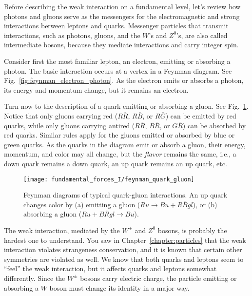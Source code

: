 Before describing the weak interaction on a fundamental level,
let's review how photons and gluons serve as the messengers for
the electromagnetic and strong interactions between leptons and
quarks. Messenger particles that transmit interactions, such as
photons, gluons, and the $W$'s and $Z^0$'s, are also called
intermediate bosons, because they mediate interactions and carry
integer spin.

Consider first the most familiar lepton, an electron, emitting or
absorbing a photon.  The basic interaction occurs at a vertex in a
Feynman diagram.  See Fig.~\ref{fig:feynman_electron_photon}.  As
the electron emits or absorbs a photon, its energy and momentum
change, but it remains an electron.

Turn now to the description of a quark emitting or absorbing a
gluon. See Fig.~\ref{fig:feynman_quark_gluon}.  Notice that only
gluons carrying red ($R\overline R$, $R\overline B$, or
$R\overline G$) can be emitted by red quarks, while only gluons
carrying antired ($R\overline R$, $B\overline R$, or $G\overline
R$) can be absorbed by red quarks.  Similar rules apply for the
gluons emitted or absorbed by blue or green quarks.  As the quarks
in the diagram emit or absorb a gluon, their energy, momentum, and
color may all change, but the {\em flavor} remains the same, i.e.,
a down quark remains a down quark, an up quark remains an up
quark, etc.


\begin{figure}[tbp]
\begin{center}
\begin{minipage}{10cm}
\begin{center}
\texttt{[image: fundamental\_forces\_I/feynman\_quark\_gluon]}
\caption{Feynman diagrams of typical quark-gluon interactions.  An
up quark changes color by (a) emitting a gluon ($Ru \rightarrow
Bu + R\bar{B}gl$), or (b) absorbing a gluon ($Ru + B\bar{R}gl \rightarrow
Bu$).}
\label{fig:feynman_quark_gluon}
\end{center}
\end{minipage}
\end{center}
\end{figure}

The weak interaction, mediated by the $W^\pm$ and $Z^0$ bosons, is
probably the hardest one to understand.  You saw in
Chapter~\ref{chapter:particles} that the weak interaction violates
strangeness conservation, and it is known that certain other
symmetries are violated as well.  We know that both quarks and
leptons seem to ``feel'' the weak interaction, but it affects
quarks and leptons somewhat differently.  Since the $W^\pm$ bosons
carry electric charge, the particle emitting or absorbing a $W$
boson must change its identity in a major way.


